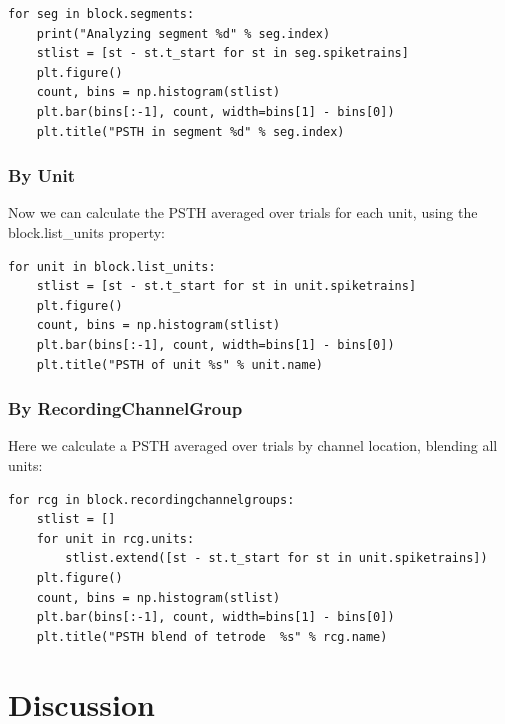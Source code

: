 \documentclass{frontiers}
\begin{document}
\begin{lstlisting}[style=display]
for seg in block.segments:
    print("Analyzing segment %d" % seg.index)
    stlist = [st - st.t_start for st in seg.spiketrains]
    plt.figure()
    count, bins = np.histogram(stlist)
    plt.bar(bins[:-1], count, width=bins[1] - bins[0])
    plt.title("PSTH in segment %d" % seg.index)
\end{lstlisting}

\subsubsection{By Unit}

Now we can calculate the PSTH averaged over trials for each unit, using the block.list_units property:

\begin{lstlisting}[style=display]
for unit in block.list_units:
    stlist = [st - st.t_start for st in unit.spiketrains]
    plt.figure()
    count, bins = np.histogram(stlist)
    plt.bar(bins[:-1], count, width=bins[1] - bins[0])
    plt.title("PSTH of unit %s" % unit.name)
\end{lstlisting}


\subsubsection{By RecordingChannelGroup}
Here we calculate a PSTH averaged over trials by channel location, blending all units:
\begin{lstlisting}[style=display]
for rcg in block.recordingchannelgroups:
    stlist = []
    for unit in rcg.units:
        stlist.extend([st - st.t_start for st in unit.spiketrains])
    plt.figure()
    count, bins = np.histogram(stlist)
    plt.bar(bins[:-1], count, width=bins[1] - bins[0])
    plt.title("PSTH blend of tetrode  %s" % rcg.name)
\end{lstlisting}



\section{Discussion}

\end{document}
